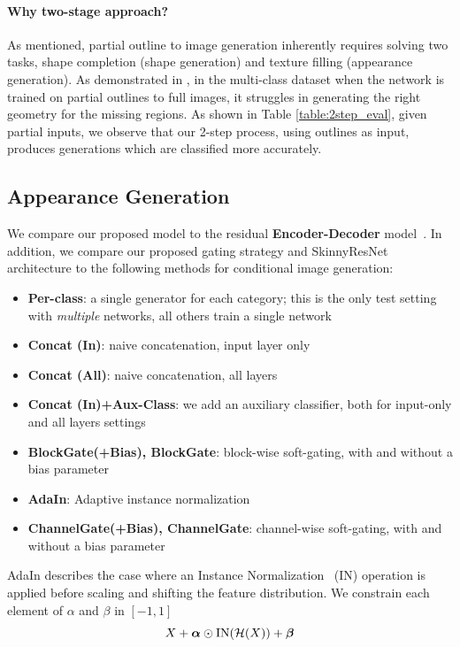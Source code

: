 \paragraph{Why two-stage approach?} As mentioned, partial outline to image generation inherently requires solving two tasks, shape completion (shape generation) and texture filling (appearance generation). As demonstrated in , in the multi-class dataset when the network is trained on partial outlines to full images, it struggles in generating the right geometry for the missing regions. As shown in Table \ref{table:2step_eval}, given partial inputs, we observe that our 2-step process, using outlines as input, produces generations which are classified more accurately.



\subsection{Appearance Generation}
We compare our proposed model to the residual \textbf{Encoder-Decoder} model~\cite{huang2018multimodal}.
In addition, we compare our proposed gating strategy and SkinnyResNet architecture to the following methods for  conditional image generation:

\begin{itemize}[noitemsep,leftmargin=12pt]
\item{\bf Per-class}: a single generator for each category; this is the only test setting with \textit{multiple} networks, all others train a single network
\item{\bf Concat (In)}: naive concatenation, input layer only
\item{\bf Concat (All)}: naive concatenation, all layers
\item{\bf Concat (In)+Aux-Class}: we add an auxiliary classifier, both for input-only and all layers settings
\item{\bf BlockGate(+Bias), BlockGate}: block-wise soft-gating, with and without a bias parameter
\item{\bf AdaIn}: Adaptive instance normalization
\item{\bf ChannelGate(+Bias), ChannelGate}: channel-wise soft-gating, with and without a bias parameter
\end{itemize}
AdaIn describes the case where an Instance Normalization~\cite{ulyanovinstance} (IN) operation is applied before scaling and shifting the feature distribution.
We constrain each element of {\boldmath $\alpha$} and {\boldmath $\beta$} in $[-1, 1]$ %
\vspace{-2mm}
\begin{equation}
X + \mbox{\boldmath $\alpha$} \odot \text{IN} (\mathcal{H}(X)) + \mbox{\boldmath $\beta$}
\end{equation}

